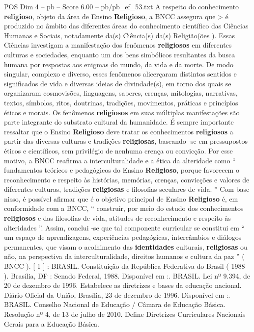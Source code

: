 \begin{textsample}{POS Dim 4 – pb – Score 6.00 – pb/pb\_ef\_53.txt}
A respeito do conhecimento \textbf{religioso}, objeto da área de Ensino \textbf{Religioso}, a BNCC assegura que > é produzido no âmbito das diferentes áreas do conhecimento científico das Ciências Humanas e Sociais, notadamente da(s) Ciência(s) da(s) Religião(ões ).
Essas Ciências investigam a manifestação dos fenômenos \textbf{religiosos} em diferentes culturas e sociedades, enquanto um dos bens simbólicos resultantes da busca humana por respostas aos enigmas do mundo, da vida e da morte.
De modo singular, complexo e diverso, esses fenômenos alicerçaram distintos sentidos e significados de vida e diversas ideias de divindade(s), em torno dos quais se organizaram cosmovisões, linguagens, saberes, crenças, mitologias, narrativas, textos, símbolos, ritos, doutrinas, tradições, movimentos, práticas e princípios éticos e morais.
Os fenômenos \textbf{religiosos} em suas múltiplas manifestações são parte integrante do substrato cultural da humanidade.
É sempre importante ressaltar que o Ensino \textbf{Religioso} deve tratar os conhecimentos \textbf{religiosos} a partir das diversas culturas e tradições \textbf{religiosas}, baseando -se em pressupostos éticos e científicos, sem privilégio de nenhuma crença ou convicção.
Por esse motivo, a BNCC reafirma a interculturalidade e a ética da alteridade como “ fundamentos teóricos e pedagógicos do Ensino \textbf{Religioso}, porque favorecem o reconhecimento e respeito às histórias, memórias, crenças, convicções e valores de diferentes culturas, tradições \textbf{religiosas} e filosofias seculares de vida. ” Com base nisso, é possível afirmar que é o objetivo principal de Ensino \textbf{Religioso} é, em conformidade com a BNCC, “ construir, por meio do estudo dos conhecimentos \textbf{religiosos} e das filosofias de vida, atitudes de reconhecimento e respeito às alteridades ”.
Assim, conclui -se que tal componente curricular se constitui em “ um espaço de aprendizagens, experiências pedagógicas, intercâmbios e diálogos permanentes, que visam o acolhimento das \textbf{identidades} culturais, \textbf{religiosas} ou não, na perspectiva da interculturalidade, direitos humanos e cultura da paz ” ( BNCC ). [ 1 ] : BRASIL.
Constituição da República Federativa do Brasil ( 1988 ).
Brasília, DF : Senado Federal, 1988.
Disponível em :.
BRASIL.
Lei nº 9.394, de 20 de dezembro de 1996.
Estabelece as diretrizes e bases da educação nacional.
Diário Oficial da União, Brasília, 23 de dezembro de 1996.
Disponível em :.
BRASIL.
Conselho Nacional de Educação / Câmara de Educação Básica.
Resolução nº 4, de 13 de julho de 2010.
Define Diretrizes Curriculares Nacionais Gerais para a Educação Básica.

\end{textsample}
